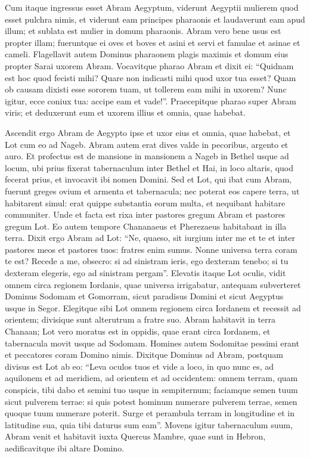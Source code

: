 \begin{biblechapter}
\verse Cum itaque ingressus esset Abram Aegyptum, viderunt Aegyptii mulierem quod esset pulchra nimis, 
\verse et viderunt eam principes pharaonis et laudaverunt eam apud illum; et sublata est mulier in domum pharaonis. 
\verse Abram vero bene usus est propter illam; fueruntque ei oves et boves et asini et servi et famulae et asinae et cameli. 
\verse Flagellavit autem Dominus pharaonem plagis maximis et domum eius propter Sarai uxorem Abram. 
\verse Vocavitque pharao Abram et dixit ei: “Quidnam est hoc quod fecisti mihi? Quare non indicasti mihi quod uxor tua esset? 
\verse Quam ob causam dixisti esse sororem tuam, ut tollerem eam mihi in uxorem? Nunc igitur, ecce coniux tua: accipe eam et vade!”. 
\verse Praecepitque pharao super Abram viris; et deduxerunt eum et uxorem illius et omnia, quae habebat. 
\end{biblechapter}

\begin{biblechapter}  
\verse Ascendit ergo Abram de Aegypto ipse et uxor eius et omnia, quae habebat, et Lot cum eo ad Nageb. 
\verse Abram autem erat dives valde in pecoribus, argento et auro. 
\verse Et profectus est de mansione in mansionem a Nageb in Bethel usque ad locum, ubi prius fixerat tabernaculum inter Bethel et Hai, 
\verse in loco altaris, quod fecerat prius, et invocavit ibi nomen Domini. 
\verse Sed et Lot, qui ibat cum Abram, fuerunt greges ovium et armenta et tabernacula; 
\verse nec poterat eos capere terra, ut habitarent simul: erat quippe substantia eorum multa, et nequibant habitare communiter. 
\verse Unde et facta est rixa inter pastores gregum Abram et pastores gregum Lot. Eo autem tempore Chananaeus et Pherezaeus habitabant in illa terra. 
\verse Dixit ergo Abram ad Lot: “Ne, quaeso, sit iurgium inter me et te et inter pastores meos et pastores tuos: fratres enim sumus. 
\verse Nonne universa terra coram te est? Recede a me, obsecro: si ad sinistram ieris, ego dexteram tenebo; si tu dexteram elegeris, ego ad sinistram pergam”. 
\verse Elevatis itaque Lot oculis, vidit omnem circa regionem Iordanis, quae universa irrigabatur, antequam subverteret Dominus Sodomam et Gomorram, sicut paradisus Domini et sicut Aegyptus usque in Segor. 
\verse Elegitque sibi Lot omnem regionem circa Iordanem et recessit ad orientem; divisique sunt alterutrum a fratre suo. 
\verse Abram habitavit in terra Chanaan; Lot vero moratus est in oppidis, quae erant circa Iordanem, et tabernacula movit usque ad Sodomam.  
\verse Homines autem Sodomitae pessimi erant et peccatores coram Domino nimis. 
\verse Dixitque Dominus ad Abram, postquam divisus est Lot ab eo: “Leva oculos tuos et vide a loco, in quo nunc es, ad aquilonem et ad meridiem, ad orientem et ad occidentem: 
\verse omnem terram, quam conspicis, tibi dabo et semini tuo usque in sempiternum; 
\verse faciamque semen tuum sicut pulverem terrae: si quis potest hominum numerare pulverem terrae, semen quoque tuum numerare poterit.  
\verse Surge et perambula terram in longitudine et in latitudine sua, quia tibi daturus sum eam”. 
\verse Movens igitur tabernaculum suum, Abram venit et habitavit iuxta Quercus Mambre, quae sunt in Hebron, aedificavitque ibi altare Domino. 
\end{biblechapter}

